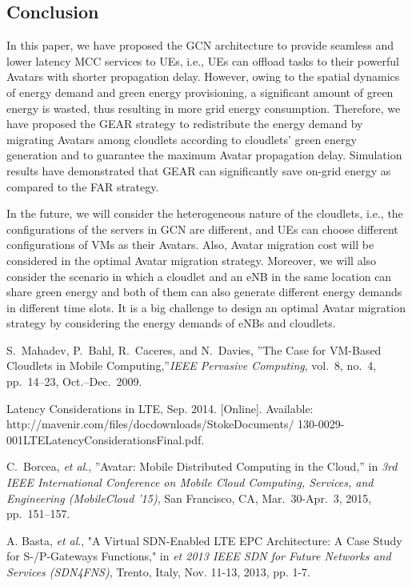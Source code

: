 \documentclass[journal,12pt,draftclsnofoot,onecolumn]{IEEEtran}
\begin{document}
\begin{titlepage}
\begin{center}
	
\section{Conclusion}
In this paper, we have proposed the GCN architecture to provide seamless and lower latency MCC services to UEs, i.e., UEs can offload tasks to their powerful Avatars with shorter propagation delay. However, owing to the spatial dynamics of energy demand and green energy provisioning, a significant amount of green energy is wasted, thus resulting in more grid energy consumption. Therefore, we have proposed the GEAR strategy to redistribute the energy demand by migrating Avatars among cloudlets according to cloudlets' green energy generation and to guarantee the maximum Avatar propagation delay. Simulation results have demonstrated that GEAR can significantly save on-grid energy as compared to the FAR strategy.\

In the future, we will consider the heterogeneous nature of the cloudlets, i.e., the configurations of the servers in GCN are different, and UEs can choose different configurations of VMs as their Avatars. Also, Avatar migration cost will be considered in the optimal Avatar migration strategy. Moreover, we will also consider the scenario in which a cloudlet and an eNB in the same location can share green energy and both of them can also generate different energy demands in different time slots. It is a big challenge to design an optimal Avatar migration strategy by considering the energy demands of eNBs and cloudlets.



\begin{thebibliography}{15}

S.~Mahadev, P.~Bahl, R.~Caceres, and N.~Davies, ''{The Case for VM-Based Cloudlets in Mobile Computing},''\emph{IEEE Pervasive Computing}, vol.~8, no.~4, pp.~14--23, Oct.--Dec.~2009.

Latency Considerations in LTE, Sep. 2014. [Online]. Available: http://mavenir.com/files/docdownloads/StokeDocuments/ 130-0029-001LTELatencyConsiderationsFinal.pdf.

C.~Borcea, \emph{et al}., ''{Avatar: Mobile Distributed Computing in the Cloud},'' in \emph{3rd IEEE International Conference on Mobile Cloud Computing, Services, and Engineering (MobileCloud '15)}, San Francisco, CA, Mar.~30-Apr.~3, 2015, pp.~151--157.

A. Basta, \emph{et al}., "A Virtual SDN-Enabled LTE EPC Architecture: A Case Study for S-/P-Gateways Functions," in \emph{et 2013 IEEE SDN for Future Networks and Services (SDN4FNS)}, Trento, Italy, Nov. 11-13, 2013, pp. 1-7.


\end{thebibliography}
\end{center}
\end{titlepage}
\end{document}
